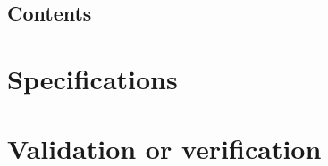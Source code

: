 \documentclass[final]{phd}
\begin{document}
\pagestyle{empty}



\frontmatter%

\cleardoublepage
\pagestyle{fancy}

\chapter*{Contents}
\renewcommand\contentsname{}
\makeatletter
{}
\makeatother

%

\mainmatter

\part{Specifications}









\part{Validation or verification}

%

%

%
\end{document}
